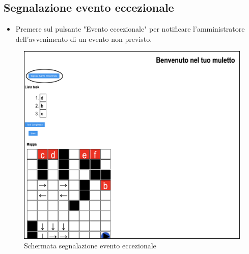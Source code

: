\subsection{Segnalazione evento eccezionale}
\begin{itemize}
    \item Premere sul pulsante "Evento eccezionale" per notificare l'amministratore dell'avvenimento di un evento non previsto.
\end{itemize}
\begin{figure}[H]
    \centering
    \includegraphics[scale=0.45]{res/images/forklift_evento.png}
    \caption{Schermata segnalazione evento eccezionale}
\end{figure}